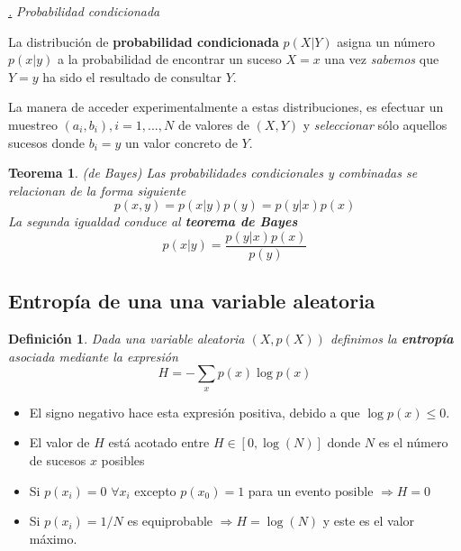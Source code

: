 \documentclass[a4paper,11pt]{book} %
\newtheorem{teorema_contador}{Teorema}
\newcommand{\Teorema}[1]{
		\begin{mybox_gray2}{}
			\begin{teorema_contador}
				 #1 
			\end{teorema_contador} 
		\end{mybox_gray2}
	}
\newtheorem{definicion_contador}{Definición}
\newcommand{\Definicion}[1]{
		\begin{mybox_gray2}{}
			\begin{definicion_contador}
				 #1 
			\end{definicion_contador} 
		\end{mybox_gray2}
	}
\numberwithin{equation}{chapter}
\def\subsubiContadorIt{\par\addtocounter{subsubsection}{1}\underline{\it\thesubsubsection.}\hskip0.5cm \setcounter{subsubsubsectionIt}{0}}
\newcommand{\SubsubiIt}[1]{
		\subsubiContadorIt \textit{#1}
	}
\newcounter{subsubsubsectionIt}[subsubsection]
\begin{document}
			\SubsubiIt{Probabilidad condicionada}

\begin{mybox_gray2}{}
La distribución de \textbf{probabilidad condicionada} $p(X|Y)$ asigna un número $p(x|y)$ a la probabilidad  de encontrar un suceso $X=x$ una vez \textit{sabemos} que $Y=y$ ha sido el resultado de consultar $Y$. 
\end{mybox_gray2}

La manera de acceder experimentalmente a estas distribuciones, es efectuar un muestreo $(a_i,b_i), i=1,...,N$ de valores de $(X,Y)$ y \textit{seleccionar} sólo aquellos sucesos donde $b_i = y$ un valor concreto de $Y$.

\Teorema{ \textit{(de Bayes)} 
Las probabilidades condicionales y combinadas se relacionan de la forma siguiente
	\begin{equation}
	p(x,y) = p(x|y)p(y) = p(y|x) p(x)
	\end{equation}
La segunda igualdad conduce al \textbf{teorema de Bayes}
	\begin{equation}
	p(x|y) = \frac{p(y|x)p(x)}{p(y)}
	\end{equation}
}

		\subsection{Entropía de una una variable aleatoria}

	\Definicion{
	Dada una variable aleatoria $(X,p(X))$ definimos la \textbf{entropía} asociada mediante la expresión
     	\begin{equation}
     	H = -\sum_x p(x)\log p(x)
     	\end{equation}
	}

\begin{itemize}
	\item El signo negativo hace esta expresión positiva, debido a que $\log p(x)\leq 0$.
	
	\item El valor de $H$ está acotado entre $H\in [0,\log(N)]$ donde $N$ es el número de sucesos $x$ posibles
	
	\item Si $p(x_i)=0 \,\,  \forall x_i$ excepto $p(x_0)=1$ para un evento posible $\Rightarrow H=0$
	
	\item Si $p(x_i) = 1/N$ es equiprobable $\Rightarrow H = \log(N)$ y este es el valor máximo. 
	
\end{itemize}
\end{document}
